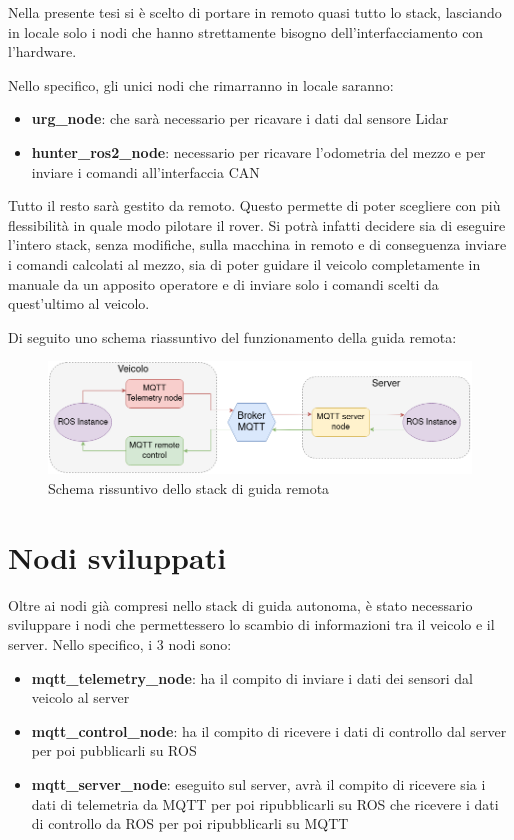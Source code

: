 \noindent Nella presente tesi si è scelto di portare in remoto quasi tutto lo stack, lasciando in locale solo i nodi che hanno strettamente bisogno dell'interfacciamento con l'hardware.

\noindent Nello specifico, gli unici nodi che rimarranno in locale saranno:

\begin{itemize}
  \item \textbf{urg\_node}: che sarà necessario per ricavare i dati dal sensore Lidar
  \item \textbf{hunter\_ros2\_node}: necessario per ricavare l'odometria del mezzo e per inviare i comandi all'interfaccia CAN
\end{itemize}

\noindent Tutto il resto sarà gestito da remoto. Questo permette di poter scegliere con più flessibilità in quale modo pilotare il rover. Si potrà infatti decidere sia di eseguire l'intero stack, senza modifiche, sulla macchina in remoto e di conseguenza inviare i comandi calcolati al mezzo, sia di poter guidare il veicolo completamente in manuale da un apposito operatore e di inviare solo i comandi scelti da quest'ultimo al veicolo.

\noindent Di seguito uno schema riassuntivo del funzionamento della guida remota:

\begin{figure}[h]
  \centering
  \includegraphics[width=1\textwidth]{figures/schema_guida_remota.png}
  \caption{Schema rissuntivo dello stack di guida remota}
  \label{Schema rissuntivo dello stack di guida remota}
\end{figure}

\section{Nodi sviluppati}
Oltre ai nodi già compresi nello stack di guida autonoma, è stato necessario sviluppare i nodi che permettessero lo scambio di informazioni tra il veicolo e il server. Nello specifico, i 3 nodi sono:
\begin{itemize}
    \item \textbf{mqtt\_telemetry\_node}: ha il compito di inviare i dati dei sensori dal veicolo al server
    \item \textbf{mqtt\_control\_node}: ha il compito di ricevere i dati di controllo dal server per poi pubblicarli su ROS
    \item \textbf{mqtt\_server\_node}: eseguito sul server, avrà il compito di ricevere sia i dati di telemetria da MQTT per poi ripubblicarli su ROS che ricevere i dati di controllo da ROS per poi ripubblicarli su MQTT
\end{itemize}

